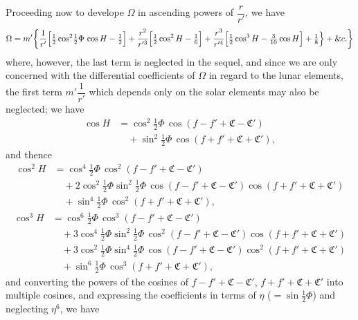 \documentclass[11pt]{article}
\begin{document}
\medskip
\noindent Proceeding now to develope $\Omega$ in ascending powers of $\dfrac{r}{r'}$, we have
\[
\Omega = m'\biggl\{\frac{1}{r'}\Bigl[\tfrac{1}{2}\cos^{2}\!\tfrac{1}{2}\Phi\,\cos H - \tfrac{1}{2}\Bigr] + \frac{r^{2}}{r'^{3}}\Bigl[\tfrac{1}{2}\cos^{2}H - \tfrac{1}{6}\Bigr] + \frac{r^{3}}{r'^{4}}\Bigl[\tfrac{1}{2}\cos^{3}H - \tfrac{3}{10}\cos H\Bigr] + \tfrac{1}{8}\Bigr\} + \&c.\biggr\}
\]
where, however, the last term is neglected in the sequel, and since we are only concerned with the differential coefficients of $\Omega$ in regard to the lunar elements, the first term $m'\dfrac{1}{r'}$ which depends only on the solar elements may also be neglected; we have
\begin{align*}
\cos H &= \cos^{2}\!\tfrac{1}{2}\Phi\,\cos(f-f'+\mathfrak{C}-\mathfrak{C}')\\
&\quad + \sin^{2}\!\tfrac{1}{2}\Phi\,\cos(f+f'+\mathfrak{C}+\mathfrak{C}'),
\end{align*}
and thence
\begin{align*}
\cos^{2}H &= \cos^{4}\!\tfrac{1}{2}\Phi\,\cos^{2}(f-f'+\mathfrak{C}-\mathfrak{C}')\\
&\quad + 2\cos^{2}\!\tfrac{1}{2}\Phi\sin^{2}\!\tfrac{1}{2}\Phi\,\cos(f-f'+\mathfrak{C}-\mathfrak{C}')\cos(f+f'+\mathfrak{C}+\mathfrak{C}')\\
&\quad + \sin^{4}\!\tfrac{1}{2}\Phi\,\cos^{2}(f+f'+\mathfrak{C}+\mathfrak{C}'),
\end{align*}
\begin{align*}
\cos^{3}H &= \cos^{6}\!\tfrac{1}{2}\Phi\,\cos^{3}(f-f'+\mathfrak{C}-\mathfrak{C}')\\
&\quad + 3\cos^{4}\!\tfrac{1}{2}\Phi\sin^{2}\!\tfrac{1}{2}\Phi\,\cos^{2}(f-f'+\mathfrak{C}-\mathfrak{C}')\cos(f+f'+\mathfrak{C}+\mathfrak{C}')\\
&\quad + 3\cos^{2}\!\tfrac{1}{2}\Phi\sin^{4}\!\tfrac{1}{2}\Phi\,\cos(f-f'+\mathfrak{C}-\mathfrak{C}')\cos^{2}(f+f'+\mathfrak{C}+\mathfrak{C}')\\
&\quad + \sin^{6}\!\tfrac{1}{2}\Phi\,\cos^{3}(f+f'+\mathfrak{C}+\mathfrak{C}'),
\end{align*}
and converting the powers of the cosines of $f-f'+\mathfrak{C}-\mathfrak{C}'$, $f+f'+\mathfrak{C}+\mathfrak{C}'$ into multiple cosines, and expressing the coefficients in terms of $\eta$ ($=\sin\tfrac{1}{2}\Phi$) and neglecting $\eta^{6}$, we have
\end{document}
